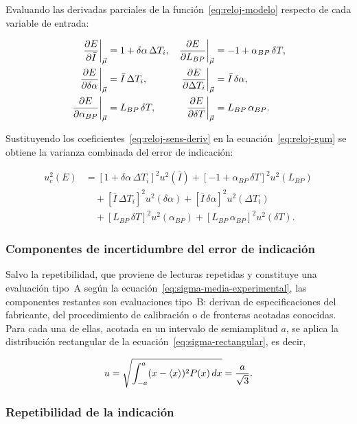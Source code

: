 Evaluando las derivadas parciales de la función~\eqref{eq:reloj-modelo} respecto de
cada variable de entrada:

\begin{align}
  \left.\frac{\partial E}{\partial \bar{I}}\right|_{\vec\mu} &= 1 + \delta\alpha \, \Delta T_i, &
  \left.\frac{\partial E}{\partial L_{BP}}\right|_{\vec\mu} &= -1 + \alpha_{BP} \, \delta T, \nonumber \\
  \left.\frac{\partial E}{\partial \delta\alpha}\right|_{\vec\mu} &= \bar{I} \, \Delta T_i, &
  \left.\frac{\partial E}{\partial \Delta T_i}\right|_{\vec\mu} &= \bar{I} \, \delta\alpha, \label{eq:reloj-sens-deriv} \\
  \left.\frac{\partial E}{\partial \alpha_{BP}}\right|_{\vec\mu} &= L_{BP} \, \delta T, &
  \left.\frac{\partial E}{\partial \delta T}\right|_{\vec\mu} &= L_{BP} \, \alpha_{BP}. \nonumber
\end{align}

Sustituyendo los coeficientes~\eqref{eq:reloj-sens-deriv} en la
ecuación~\eqref{eq:reloj-gum} se obtiene la varianza combinada del error de
indicación:

\begin{align}
  u_c^2(E) &=
  [1 + \delta\alpha \, \Delta T_i]^2 u^2(\bar{I}) +
  [-1 + \alpha_{BP} \, \delta T]^2 u^2(L_{BP}) \nonumber \\
  &\quad + [\bar{I} \, \Delta T_i]^2 u^2(\delta\alpha) +
  [\bar{I} \, \delta\alpha]^2 u^2(\Delta T_i) \label{eq:reloj-varianza} \\
  &\quad + [L_{BP} \, \delta T]^2 u^2(\alpha_{BP}) +
  [L_{BP} \, \alpha_{BP}]^2 u^2(\delta T). \nonumber
\end{align}

\subsubsection{Componentes de incertidumbre del error de indicación}

Salvo la repetibilidad, que proviene de lecturas repetidas y constituye una evaluación
tipo~A según la ecuación~\eqref{eq:sigma-media-experimental}, las componentes restantes
son evaluaciones tipo~B: derivan de especificaciones del fabricante, del procedimiento
de calibración o de fronteras acotadas conocidas. Para cada una de ellas, acotada en un
intervalo de semiamplitud $a$, se aplica la distribución rectangular de la
ecuación~\eqref{eq:sigma-rectangular}, es decir,

\begin{equation}
  u = \sqrt{\int_{-a}^{a} (x - \left\langle x \right\rangle)^2 P(x)\,dx} = \frac{a}{\sqrt{3}}.
  \label{eq:reloj-rectangular}
\end{equation}

\subsubsection*{Repetibilidad de la indicación}

